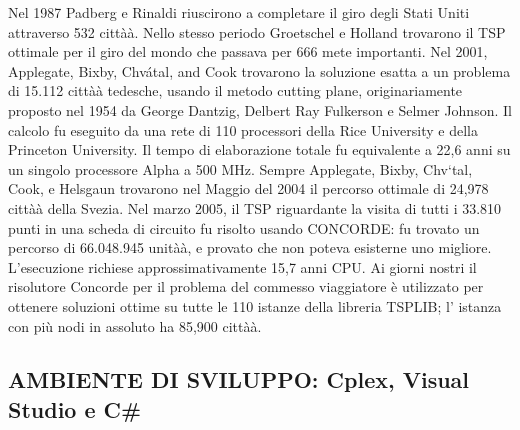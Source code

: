 \documentclass[11pt]{article}
\begin{document}
Nel 1987  Padberg e Rinaldi riuscirono a completare il giro degli Stati Uniti attraverso 532 città\`a. Nello stesso periodo Groetschel e Holland trovarono il TSP ottimale per il giro del mondo che passava per 666 mete importanti. 
Nel 2001, Applegate, Bixby, Chvátal, and Cook trovarono la soluzione esatta a un problema di 15.112 città\`a tedesche, usando il metodo cutting plane, originariamente proposto nel 1954 da George Dantzig, Delbert Ray Fulkerson e Selmer Johnson. Il calcolo fu eseguito da una rete di 110 processori della Rice University e della Princeton University. Il tempo di elaborazione totale fu equivalente a 22,6 anni su un singolo processore Alpha a 500 MHz.
Sempre Applegate, Bixby, Chv\a`tal, Cook, e Helsgaun trovarono nel Maggio del 2004 il percorso ottimale di 24,978 città\`a della Svezia. 
Nel marzo 2005, il TSP riguardante la visita di tutti i 33.810 punti in una scheda di circuito fu risolto usando CONCORDE: fu trovato un percorso di 66.048.945 unità\`a, e provato che non poteva esisterne uno migliore. L'esecuzione richiese approssimativamente 15,7 anni CPU. 
Ai giorni nostri il risolutore Concorde per il problema del commesso viaggiatore è utilizzato per ottenere soluzioni ottime su tutte le 110 istanze della libreria TSPLIB; l' istanza con più nodi in assoluto ha 85,900 città\`a. 


\subsection*{AMBIENTE DI SVILUPPO: Cplex, Visual Studio e C\#}
\end{document}
